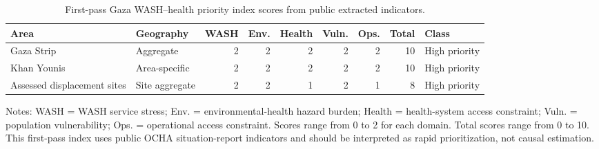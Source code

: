 \begin{table}[htbp]
\centering
\caption{First-pass Gaza WASH--health priority index scores from public extracted indicators.}
\label{tab:priority_index}
\begin{tabular}{llrrrrrrl}
\toprule
Area & Geography & WASH & Env. & Health & Vuln. & Ops. & Total & Class \\
\midrule
Gaza Strip & Aggregate & 2 & 2 & 2 & 2 & 2 & 10 & High priority \\
Khan Younis & Area-specific & 2 & 2 & 2 & 2 & 2 & 10 & High priority \\
Assessed displacement sites & Site aggregate & 2 & 2 & 1 & 2 & 1 & 8 & High priority \\
\bottomrule
\end{tabular}
\begin{flushleft}
\footnotesize Notes: WASH = WASH service stress; Env. = environmental-health hazard burden; Health = health-system access constraint; Vuln. = population vulnerability; Ops. = operational access constraint. Scores range from 0 to 2 for each domain. Total scores range from 0 to 10. This first-pass index uses public OCHA situation-report indicators and should be interpreted as rapid prioritization, not causal estimation.
\end{flushleft}
\end{table}
